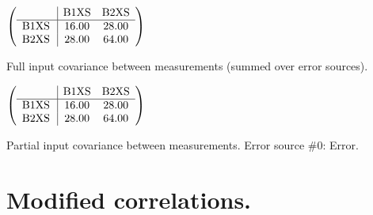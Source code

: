 \begin{table}[H]
\scriptsize
\begin{center}
\renewcommand{\arraystretch}{1.1}
\begin{math}\left(\begin{array}{c|cc}
 & \mathrm{B1XS} & 
\mathrm{B2XS} \\
\hline
\mathrm{B1XS} \hspace*{2pt} &      16.00 &      28.00 \\
\mathrm{B2XS} \hspace*{2pt} &      28.00 &      64.00 \\
\end{array}\right)\end{math}
\caption{Full input covariance between measurements (summed over error sources).}
\renewcommand{\arraystretch}{1}
\end{center}
\end{table}
\begin{table}[H]
\scriptsize
\begin{center}
\renewcommand{\arraystretch}{1.1}
\begin{math}\left(\begin{array}{c|cc}
 & \mathrm{B1XS} & 
\mathrm{B2XS} \\
\hline
\mathrm{B1XS} \hspace*{2pt} &      16.00 &      28.00 \\
\mathrm{B2XS} \hspace*{2pt} &      28.00 &      64.00 \\
\end{array}\right)\end{math}
\caption{Partial input covariance between measurements. Error source \#0: Error.}
\renewcommand{\arraystretch}{1}
\end{center}
\end{table}
\clearpage
\section{Modified correlations.}
